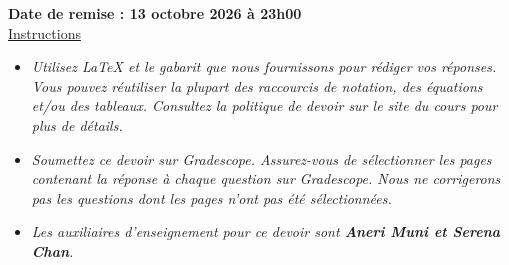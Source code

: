 \documentclass[12pt]{article}
\theoremstyle{definition}
\begin{document}
\fancyhead{}
\fancyfoot{}


\vspace{1cm}

\shorthandoff{:}
{\textbf{Date de remise : 13 octobre 2026 à 23h00}}\\


\vspace{-0.5cm}
\underline{Instructions}%
\renewcommand{\labelitemi}{\textbullet}
\begin{itemize}
\item \emph{Utilisez LaTeX et le gabarit que nous fournissons pour rédiger vos réponses.
Vous pouvez réutiliser la plupart des raccourcis de notation, des équations et/ou des tableaux.
Consultez la politique de devoir sur le site du cours pour plus de détails.}
\item \emph{Soumettez ce devoir sur Gradescope. Assurez-vous de sélectionner les pages contenant la réponse à chaque question sur Gradescope. Nous ne corrigerons pas les questions dont les pages n'ont pas été sélectionnées.}
\item \emph{Les auxiliaires d'enseignement pour ce devoir sont \textbf{Aneri Muni et Serena Chan}.}
\end{itemize}
\vspace{0.2cm}
\end{document}
